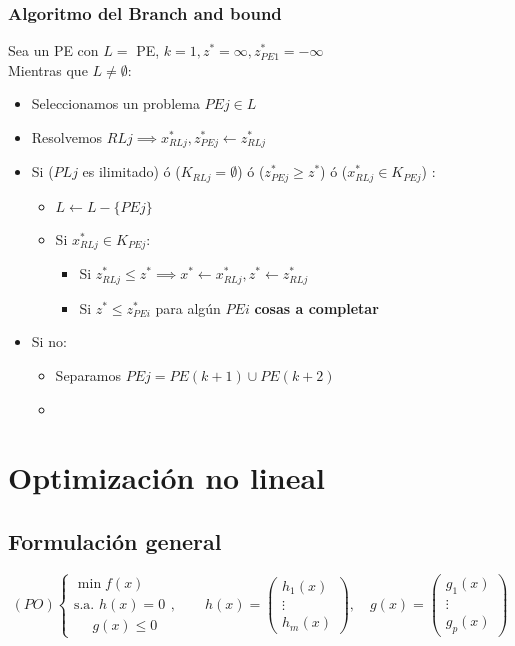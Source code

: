 \documentclass{myclass}
\begin{document}
\subsubsection{Algoritmo del Branch and bound}
Sea un PE con $L =$ {PE}, $k=1, z^* = \infty, z_{PE1}^*=-\infty$ \\
Mientras que $L\neq \emptyset$:
\begin{itemize}
  \item Seleccionamos un problema $PEj\in L$
  \item Resolvemos  $RLj \implies x^*_{RLj}, z^*_{PEj}\leftarrow z^*_{RLj}$
  \item Si ($PLj$ es ilimitado)  ó  ($K_{RLj} = \emptyset $)  ó  ($z^*_{PEj} \ge  z^*$)  ó  ($x^*_{RLj}\in K_{PEj}$) :
	\begin{itemize}
	  \item $L \leftarrow L-\{PEj\}$
	  \item Si $x^*_{RLj}\in K_{PEj}$:
		\begin{itemize}
		  \item Si $z_{RLj}^* \le z^* \implies x^* \leftarrow x^*_{RLj}, z^* \leftarrow z^*_{RLj}$
		  \item Si $z^*\le z^*_{PEi}$ para algún $PEi$  \textbf{cosas a completar}
		\end{itemize}
	\end{itemize}
  \item Si no:
	\begin{itemize}
	  \item Separamos $PEj = PE(k+1)\cup PE(k+2)$
	  \item 
	\end{itemize}
\end{itemize}


\section{Optimización no lineal}
\subsection{Formulación general}
$$
(PO)
\begin{cases}
    \min f(x) \\
    \text{s.a. } h(x) = 0 \\
    \ \ \ \ \ \ g(x) \leq 0
\end{cases}, \qquad 
h(x) = \begin{pmatrix}
h_1(x) \\
\vdots \\
h_m(x)
\end{pmatrix}, \quad 
g(x) = \begin{pmatrix}
g_1(x) \\
\vdots \\
g_p(x)
\end{pmatrix}
$$
\end{document}
